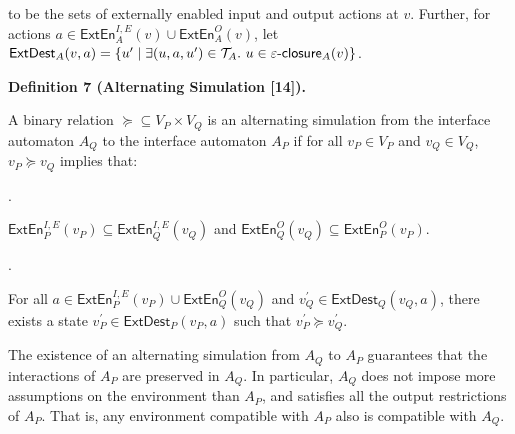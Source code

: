 \documentclass[10pt,a4paper]{article}
\begin{document}
to be the sets of externally enabled input and output actions at $v$. Further, for actions $a\in\mathsf{ExtEn}^{I,E}_{A}(v)\cup\mathsf{ExtEn}^{O}_{A}(v)$, let $\mathsf{ExtDest}_{A}(v,a)=\{u^{\prime}\mid\exists(u,a,u^{\prime})\in\mathcal{T}_{A}.\nobreak\ u\in\varepsilon\text{-}\mathsf{closure}_{A}(v)\}$.\par
 
 
 
\par\medskip\noindent\textbf{Definition 7 (Alternating Simulation [14]).}\par
 
 
A binary relation $\succeq\subseteq V_{P}\times V_{Q}$ is an alternating simulation from the interface automaton $A_{Q}$ to the interface automaton $A_{P}$ if for all $v_{P}\in V_{P}$ and $v_{Q}\in V_{Q}$, $v_{P}\succeq v_{Q}$ implies that:\par
  
\par{}. 
 
$\mathsf{ExtEn}^{I,E}_{P}(v_{P})\subseteq\mathsf{ExtEn}^{I,E}_{Q}(v_{Q})$ and $\mathsf{ExtEn}^{O}_{Q}(v_{Q})\subseteq\mathsf{ExtEn}^{O}_{P}(v_{P})$.\par
 
 
 
\par{}. 
 
For all $a\in\mathsf{ExtEn}^{I,E}_{P}(v_{P})\cup\mathsf{ExtEn}^{O}_{Q}(v_{Q})$ and $v_{Q}^{\prime}\in\mathsf{ExtDest}_{Q}(v_{Q},a)$, there exists a state $v_{P}^{\prime}\in\mathsf{ExtDest}_{P}(v_{P},a)$ such that $v_{P}^{\prime}\succeq v_{Q}^{\prime}$.\par
 
 
  
 
 
 
The existence of an alternating simulation from $A_{Q}$ to $A_{P}$ guarantees that the interactions of $A_{P}$ are preserved in $A_{Q}$. In particular, $A_{Q}$ does not impose more assumptions on the environment than $A_{P}$, and satisfies all the output restrictions of $A_{P}$. That is, any environment compatible with $A_{P}$ also is compatible with $A_{Q}$.\par
 
\end{document}
